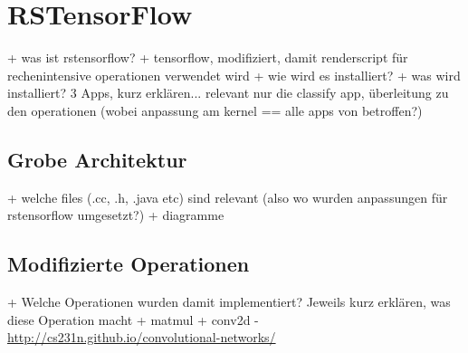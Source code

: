 \section{RSTensorFlow}
\label{sec:rstensorflow}
+ was ist rstensorflow?
	+ tensorflow, modifiziert, damit renderscript für rechenintensive operationen verwendet wird
+ wie wird es installiert?
+ was wird installiert? 3 Apps, kurz erklären... relevant nur die classify app, überleitung zu den operationen (wobei anpassung am kernel == alle apps von betroffen?)

\subsection{Grobe Architektur}
\label{subsec:architektur}
+ welche files (.cc, .h, .java etc) sind relevant (also wo wurden anpassungen für rstensorflow umgesetzt?)
+ diagramme

\subsection{Modifizierte Operationen}
\label{subsec:modoperationen}
+ Welche Operationen wurden damit implementiert? Jeweils kurz erklären, was diese Operation macht
	+ matmul 
	+ conv2d
		- \url{http://cs231n.github.io/convolutional-networks/}


